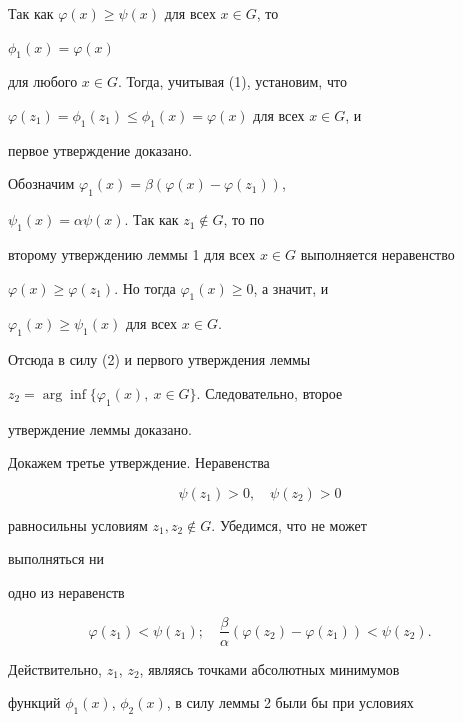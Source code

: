  


\begin{pf} Так как $\varphi(x)\ge\psi(x)$ для всех $x\in G$, то 


$\phi_1(x)=\varphi(x)$ 


для любого $x\in G$. Тогда, учитывая (1), установим, что 


$\varphi(z_1)=\phi_1(z_1)\le\phi_1(x)=\varphi(x)$ для всех $x\in G$, и 


первое утверждение доказано. 


 


Обозначим $\varphi_1(x)=\beta(\varphi(x)-\varphi(z_1))$, 


$\psi_1(x)=\alpha\psi(x)$. Так как $z_1\notin G$, то по 


второму утверждению леммы 1 для всех $x\in G$ выполняется неравенство 


$\varphi(x)\ge\varphi(z_1)$. Но тогда $\varphi_1(x)\ge 0$, а значит, и 


$\varphi_1(x)\ge \psi_1(x)$ для всех $x\in G$. 


Отсюда в силу (2) и первого утверждения леммы 


$z_2=\arg\inf\{\varphi_1(x),\ x\in G\}$. Следовательно, второе 


утверждение леммы доказано. 


 


Докажем третье утверждение. Неравенства 


\begin{equation} 


\psi(z_1)>0,\quad \psi(z_2)>0 


\end{equation} 


равносильны условиям $z_1,z_2\notin G$. Убедимся, что не может 


выполняться ни 


одно из неравенств 


\begin{equation} 


\varphi(z_1)<\psi(z_1);\quad 


\frac{\beta}{\alpha}(\varphi(z_2)-\varphi(z_1))<\psi(z_2). 


\end{equation} 


Действительно, $z_1$, $z_2$, являясь точками абсолютных минимумов 


функций $\phi_1(x)$, $\phi_2(x)$, в силу леммы 2 были бы при условиях 



\end{pf}
